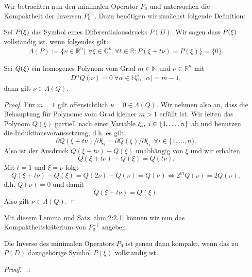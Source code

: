 Wir betrachten nun den minimalen Operator $P_0$ und untersuchen die Kompaktheit der Inversen $P_0^{-1}$. Dazu benötigen wir zunächst folgende Definition:
\begin{df}
\item Sei $P(\xi)$ das Symbol eines Differentialausdrucks $P(D)$. Wir sagen dass $P(\xi)$ vollständig ist, wenn folgendes gilt:
\begin{align*}
\Lambda(P):=\{ \nu \in \mathbb{R}^n| \ \ \forall \xi \in \mathbb{C}^n, \forall t \in \mathbb{R}: P(\xi + t\nu) = P(\xi)  \} = \{0\}.
\end{align*}
\end{df}
\begin{lem} Sei $Q(\xi)$ ein homogenes Polynom vom Grad $m \in \mathbb{N}$ und  $\nu \in \mathbb{R}^n$ mit
\begin{align*}
D^{\alpha}Q(\nu)=0 \ \forall \alpha \in \mathbb{N}_0^{n}, \ |\alpha| = m-1,
\end{align*}
dann gilt $\nu \in \Lambda(Q)$.
\end{lem}
\begin{proof}
\item Für $m=1$ gilt offensichtlich $\nu = 0 \in \Lambda(Q)$. Wir nehmen also an, dass die Behauptung für Polynome vom Grad kleiner $m>1$ erfüllt ist. Wir leiten das Polynom $Q(\xi)$ partiell nach einer Variable $\xi_i, \ i \in \{1,\ldots,n\}$ ab und benutzen die Induktionsvoraussetzung, d.h. es gilt
\begin{equation}
\partial Q(\xi + t \nu)/ \partial \xi_i = \partial Q(\xi)/\partial \xi_i \ \ \forall i \in \{1,\ldots,n\}.
\end{equation}
Also ist der Ausdruck $Q(\xi + t \nu) - Q(\xi)$ unabhängig von $\xi$ und wir erhalten
\begin{equation}
Q(\xi + t \nu) - Q(\xi) = Q(t \nu).
\end{equation}
Mit $t=1$ und $\xi=\nu$ folgt
\begin{equation}
Q(\xi + t\nu) - Q(\xi) = Q(2 \nu) - Q(\nu)= Q(\nu) \Leftrightarrow 2^m Q(\nu) = 2 Q(\nu),
\end{equation}
d.h. $Q(\nu)=0$ und damit 
\begin{equation}
Q(\xi + t\nu) = Q(\xi).
\end{equation}
Also gilt $\nu \in \Lambda(Q)$.
\end{proof}
Mit diesem Lemma und Satz \ref{thm:2:2.1} können wir nun das Kompaktheitskriterium von $P_0^{-1}$ angeben.
\begin{thm}
Die Inverse des minimalen Operators $P_0$ ist genau dann kompakt, wenn das zu $P(D)$ dazugehörige Symbol $P(\xi)$ vollständig ist.
\end{thm}
\begin{proof}

\end{proof}
